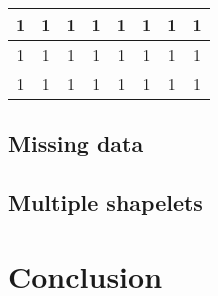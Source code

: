 \begin{minipage}[c]{\textwidth}
\begin{minipage}[c]{\textwidth}
\begin{minipage}[c]{0.27\textwidth}
{\begin{tabular}{|c|c|c|c|c|c|c|c|}
\cellcolor[rgb]{0,0,0} 1 & \cellcolor[rgb]{0,0,0} 1 & \cellcolor[rgb]{0,0,0} 1 & \cellcolor[rgb]{0,0,0} 1 & \cellcolor[rgb]{0,0,0} 1 & \cellcolor[rgb]{0,0,0} 1 & \cellcolor[rgb]{0,0,0} 1 & \cellcolor[rgb]{0,0,0} 1 \\ \hline
\cellcolor[rgb]{0,0,0} 1 & \cellcolor[rgb]{0,0,0} 1 & \cellcolor[rgb]{0,0,0} 1 & \cellcolor[rgb]{0,0,0} 1 & \cellcolor[rgb]{0,0,0} 1 & \cellcolor[rgb]{0,0,0} 1 & \cellcolor[rgb]{0,0,0} 1 & \cellcolor[rgb]{0,0,0} 1 \\ \hline
\cellcolor[rgb]{0,0,0} 1 & \cellcolor[rgb]{0,0,0} 1 & \cellcolor[rgb]{0,0,0} 1 & \cellcolor[rgb]{0,0,0} 1 & \cellcolor[rgb]{0,0,0} 1 & \cellcolor[rgb]{0,0,0} 1 & \cellcolor[rgb]{0,0,0} 1 & \cellcolor[rgb]{0,0,0} 1 \\ \hline
			\end{tabular}
			}
		\end{minipage}
	\end{minipage}
\end{minipage}


\subsection{Missing data}
\subsection{Multiple shapelets}

\section{Conclusion}

